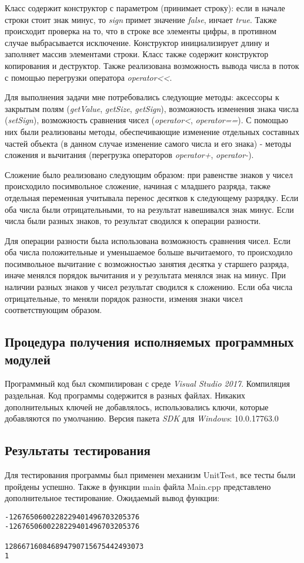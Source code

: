 \documentclass[a4paper,14pt]{article}
\begin{document}
Класс содержит конструктор с параметром (принимает строку): если в начале строки стоит знак минус, то \textit{sign} примет значение \textit{false}, инчает \textit{true}. Также происходит проверка на то, что в строке все элементы цифры, в противном случае выбрасывается исключение. Конструктор инициализирует длину и заполняет массив элементами строки. Класс также содержит конструктор копирования и деструктор. Также реализована возможность вывода числа в поток с помощью перегрузки оператора \textit{operator<<}.

Для выполнения задачи мне потребовались следующие методы: аксессоры к закрытым полям (\textit{getValue}, \textit{getSize}, \textit{getSign}), возможность изменения знака числа (\textit{setSign}), возможность сравнения чисел (\textit{operator<}, \textit{operator==}). С помощью них были реализованы методы, обеспечивающие изменение отдельных составных частей объекта (в данном случае изменение самого числа и его знака) - методы сложения и вычитания (перегрузка операторов \textit{operator+},  \textit{operator-}). 

Сложение было реализовано следующим образом: при равенстве знаков у чисел происходило посимвольное сложение, начиная с младшего разряда, также отдельная переменная учитывала перенос десятков к следующему разрядку. Если оба числа были отрицательными, то на результат навешивался знак минус. Если числа были разных знаков, то результат сводился к операции разности.

Для операции разности была использована возможность сравнения чисел. Если оба числа положительные и уменьшаемое больше вычитаемого, то происходило посимвольное вычитание с возможностью занятия десятка у старшего разряда, иначе менялся порядок вычитания и у результата менялся знак на минус. При наличии разных знаков у чисел результат сводился к сложению. Если оба числа отрицательные, то меняли порядок разности, изменяя знаки чисел соответствующим образом.

\subsection{Процедура получения исполняемых программных модулей}
Программный код был скомпилирован с среде \textit{Visual Studio 2017}. Компиляция раздельная. Код программы содержится в разных файлах. Никаких дополнительных ключей не добавлялось, использовались ключи, которые добавляются по умолчанию. Версия пакета \textit{SDK} для \textit{Windows}: 10.0.17763.0
\subsection{Результаты тестирования}
Для тестирования программы был применен механизм UnitTest, все тесты были пройдены успешно.
Также в функции main файла Main.cpp представлено дополнительное тестирование. Ожидаемый вывод функции: 
\begin{verbatim}
-1267650600228229401496703205376
-1267650600228229401496703205376

128667160846894790715675442493073
1
\end{verbatim}
\end{document}
